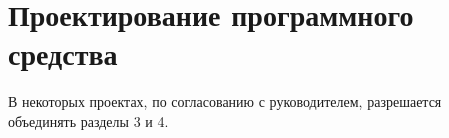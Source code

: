 \section{Проектирование программного средства}
\label{sec:design}

В некоторых проектах, по согласованию с руководителем, разрешается объединять разделы 3 и 4.
